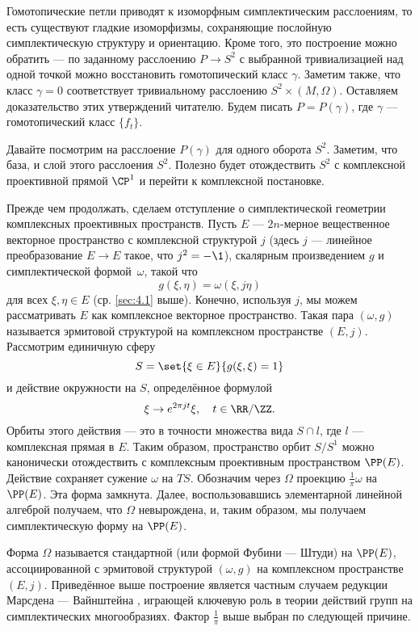 Гомотопические петли приводят к изоморфным симплектическим расслоениям, то есть существуют гладкие изоморфизмы, сохраняющие послойную симплектическую структуру и ориентацию.
Кроме того, это построение можно обратить --- по заданному расслоению $P \to S^2$ с выбранной тривиализацией над одной точкой можно восстановить гомотопический класс $\gamma$.
Заметим также, что класс $\gamma = 0$ соответствует тривиальному расслоению $S^2 \times (M, \Omega)$.
Оставляем доказательство этих утверждений читателю.
Будем писать $P = P(\gamma)$, где $\gamma$ --- гомотопический класс $\{f_t\}$.

Давайте посмотрим на расслоение $P(\gamma)$ для одного оборота $S^2$.
Заметим, что база, и слой этого расслоения $S^2$.
Полезно будет отождествить $S^2$ с комплексной проективной прямой $\CP^1$ и перейти к комплексной постановке.

Прежде чем продолжать, сделаем отступление о симплектической геометрии комплексных проективных пространств.
Пусть $E$ --- $2n$-мерное вещественное векторное пространство с комплексной структурой $j$
(здесь $j$ --- линейное преобразование $E\to E$ такое, что $j^2 = -\1$),
скалярным произведением $g$ и симплектической формой~$\omega$, такой что
\[g(\xi, \eta ) = \omega(\xi, j\eta)\]
для всех $\xi, \eta \in E$ (ср. \ref{sec:4.1} выше).
Конечно, используя $j$, мы можем рассматривать $E$ как комплексное векторное пространство.
Такая пара $(\omega, g)$ называется эрмитовой структурой на комплексном пространстве $(E, j)$.
Рассмотрим единичную сферу
\[S = \set{\xi \in E}{g(\xi, \xi) = 1}\]
и действие окружности на $S$, определённое формулой 
\[\xi \to e^{2\pi jt} \xi,\quad t \in \RR/\ZZ.\]
Орбиты этого действия --- это в точности множества вида $S \cap l$, где $l$ --- комплексная прямая в $E$.
Таким образом, пространство орбит $S/S^1$ можно канонически отождествить с комплексным проективным пространством $\PP(E)$.
Действие сохраняет сужение $\omega$ на $T S$.
Обозначим через $\Omega$ проекцию $\tfrac1\pi \omega$ на $\PP(E)$.
Эта форма замкнута.
Далее, воспользовавшись элементарной линейной алгеброй получаем, что $\Omega$ невырождена, и, таким образом, мы получаем симплектическую форму на $\PP(E)$.

Форма $\Omega$ называется стандартной (или формой Фубини --- Штуди) на $\PP(E)$, ассоциированной с эрмитовой структурой $(\omega, g)$ на комплексном пространстве $(E, j)$.
Приведённое выше построение является частным случаем редукции Марсдена --- Вайнштейна \cite{MS}, играющей ключевую роль в теории действий групп на симплектических многообразиях.
Фактор $\tfrac1\pi$ выше выбран по следующей причине.

